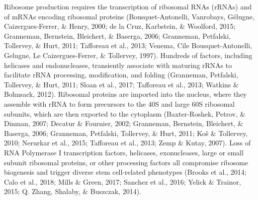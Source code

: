 \documentclass[12pt,oneside]{reedthesis}
\begin{document}
Ribosome production requires the transcription of ribosomal RNAs (rRNAs)
and of mRNAs encoding ribosomal proteins (Bousquet-Antonelli, Vanrobays, Gélugne, Caizergues-Ferrer, \& Henry, 2000; de la Cruz, Karbstein, \& Woolford, 2015; Granneman, Bernstein, Bleichert, \& Baserga, 2006; Granneman, Petfalski, Tollervey, \& Hurt, 2011; Tafforeau et al., 2013; Venema, Cile Bousquet-Antonelli, Gelugne, Le Caizergues-Ferrer, \& Tollervey, 1997). Hundreds of factors,
including helicases and endonucleases, transiently associate with
maturing rRNAs to facilitate rRNA processing, modification, and folding
(Granneman, Petfalski, Tollervey, \& Hurt, 2011; Sloan et al., 2017; Tafforeau et al., 2013; Watkins \& Bohnsack, 2012).
Ribosomal proteins are imported into the nucleus, where they assemble
with rRNA to form precursors to the 40S and large 60S ribosomal
subunits, which are then exported to the cytoplasm
(Baxter-Roshek, Petrov, \& Dinman, 2007; Decatur \& Fournier, 2002; Granneman, Bernstein, Bleichert, \& Baserga, 2006; Granneman, Petfalski, Tollervey, \& Hurt, 2011; Koš \& Tollervey, 2010; Nerurkar et al., 2015; Tafforeau et al., 2013; Zemp \& Kutay, 2007). Loss of RNA Polymerase I transcription
factors, helicases, exonucleases, large or small subunit ribosomal
proteins, or other processing factors all compromise ribosome biogenesis
and trigger diverse stem cell-related phenotypes (Brooks et al., 2014; Calo et al., 2018; Mills \& Green, 2017; Sanchez et al., 2016; Yelick \& Trainor, 2015; Q. Zhang, Shalaby, \& Buszczak, 2014).
\end{document}
